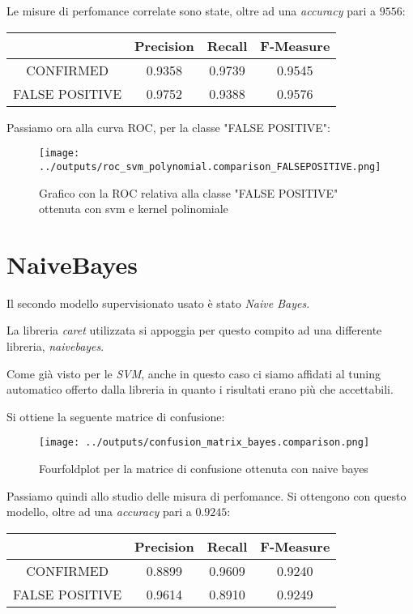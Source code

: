 Le misure di perfomance correlate sono state, oltre ad una \textit{accuracy} 
pari a $9556$:
\begin{center}
    \begin{tabular}{| c | c c c |} 
    \hline  
    & Precision & Recall & F-Measure \\ [0.5ex] 
    \hline\hline
    CONFIRMED & 0.9358 & 0.9739 & 0.9545 \\ 
    \hline
    FALSE POSITIVE  & 0.9752 & 0.9388 & 0.9576 \\ 
    \hline
    \end{tabular}
\end{center}

Passiamo ora alla curva ROC, per la classe "FALSE POSITIVE":
\begin{figure}[H]
    \centering
    \texttt{[image: ../outputs/roc\_svm\_polynomial.comparison\_FALSEPOSITIVE.png]}
    \caption{Grafico con la ROC relativa alla classe "FALSE POSITIVE" ottenuta con 
    svm e kernel polinomiale}
\end{figure}

\section{NaiveBayes}
Il secondo modello supervisionato usato è stato \textit{Naive Bayes}.

La libreria \textit{caret} utilizzata si appoggia per questo compito ad una 
differente libreria, \textit{naivebayes}.

Come già visto per le \textit{SVM}, anche in questo caso ci siamo affidati al tuning 
automatico offerto dalla libreria in quanto i risultati erano più che 
accettabili.

Si ottiene la seguente matrice di confusione:
\begin{figure}[H]
    \centering
    \texttt{[image: ../outputs/confusion\_matrix\_bayes.comparison.png]}
    \caption{Fourfoldplot per la matrice di confusione ottenuta con naive bayes}
\end{figure}
Passiamo quindi allo studio delle misura di perfomance.
Si ottengono con questo modello, oltre ad una \textit{accuracy} pari a $0.9245$:
\begin{center}
    \begin{tabular}{| c | c c c |} 
    \hline
    & Precision & Recall & F-Measure \\ [0.5ex] 
    \hline\hline
    CONFIRMED & 0.8899 & 0.9609 & 0.9240 \\ 
    \hline
    FALSE POSITIVE & 0.9614 & 0.8910 & 0.9249 \\ 
    \hline
    \end{tabular}
\end{center}

